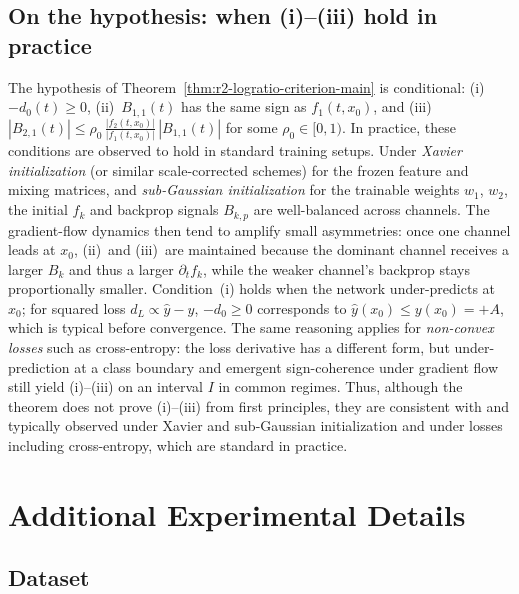 \documentclass[nohyperref]{article}
\theoremstyle{plain}
\theoremstyle{definition}
\theoremstyle{remark}
\begin{document}
\subsection{On the hypothesis: when (i)--(iii) hold in practice}
\label{app:logratio-hypothesis-practice}

The hypothesis of Theorem~\ref{thm:r2-logratio-criterion-main} is conditional: (i)~$-d_0(t)\ge 0$, (ii)~$B_{1,1}(t)$ has the same sign as $f_1(t,x_0)$, and (iii)~$|B_{2,1}(t)|\le \rho_0\,\frac{|f_2(t,x_0)|}{|f_1(t,x_0)|}\,|B_{1,1}(t)|$ for some $\rho_0\in[0,1)$. In practice, these conditions are observed to hold in standard training setups. Under \emph{Xavier initialization} (or similar scale-corrected schemes) for the frozen feature and mixing matrices, and \emph{sub-Gaussian initialization} for the trainable weights $w_1$, $w_2$, the initial $f_k$ and backprop signals $B_{k,p}$ are well-balanced across channels. The gradient-flow dynamics then tend to amplify small asymmetries: once one channel leads at $x_0$, (ii)~and (iii)~are maintained because the dominant channel receives a larger $B_k$ and thus a larger $\partial_t f_k$, while the weaker channel's backprop stays proportionally smaller. Condition~(i) holds when the network under-predicts at $x_0$; for squared loss $d_L \propto \hat{y}-y$, $-d_0\ge 0$ corresponds to $\hat{y}(x_0)\le y(x_0)=+A$, which is typical before convergence. The same reasoning applies for \emph{non-convex losses} such as cross-entropy: the loss derivative has a different form, but under-prediction at a class boundary and emergent sign-coherence under gradient flow still yield (i)--(iii) on an interval $I$ in common regimes. Thus, although the theorem does not prove (i)--(iii) from first principles, they are consistent with and typically observed under Xavier and sub-Gaussian initialization and under losses including cross-entropy, which are standard in practice.


















\section{Additional Experimental Details}
\label{app:exp-details}

\subsection{Dataset}
\label{app:datasets}
\end{document}

